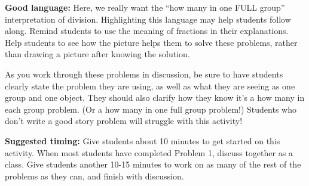 \documentclass[nooutcomes,noauthor, handout]{ximera}
\begin{document}
\begin{instructorNotes}
{\bf Good language:}  Here, we really want the ``how many in one FULL group'' interpretation of division. Highlighting this language may help students follow along.  Remind students to use the meaning of fractions in their explanations. Help students to see how the picture helps them to solve these problems, rather than drawing a picture after knowing the solution.

As you work through these problems in discussion, be sure to have students clearly state the problem they are using, as well as what they are seeing as one group and one object. They should also clarify how they know it's a how many in each group problem. (Or a how many in one full group problem!) Students who don't write a good story problem will struggle with this activity!



{\bf Suggested timing:} Give students about 10 minutes to get started on this activity. When most students have completed Problem 1, discuss together as a class. Give students another 10-15 minutes to work on as many of the rest of the problems as they can, and finish with discussion.

\end{instructorNotes}
\end{document}
